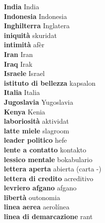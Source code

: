 \textbf{ India  } India \\
\textbf{ Indonesia  } Indonesia \\
\textbf{ Inghilterra  } Inglatera \\
\textbf{ iniquità  } skuridat \\
\textbf{ intimità  } afèr \\
\textbf{ Iran  } Iran \\
\textbf{ Iraq  } Irak \\
\textbf{ Israele  } Israel \\
\textbf{ istituto di bellezza  } kapsalon \\
\textbf{ Italia  } Italia \\
\textbf{ Jugoslavia  } Yugoslavia \\
\textbf{ Kenya  } Kenia \\
\textbf{ laboriosità  } aktividat \\
\textbf{ latte miele  } slagroom \\
\textbf{ leader politico  } hefe \\
\textbf{ lente a contatto  } kontakto \\
\textbf{ lessico mentale  } bokabulario \\
\textbf{ lettera aperta  } abierta (carta -) \\
\textbf{ lettera di credito  } acreditivo \\
\textbf{ levriero afgano  } afgano \\
\textbf{ libertà  } outonomia \\
\textbf{ linea aerea  } aerolínea \\
\textbf{ linea di demarcazione  } rant \\
